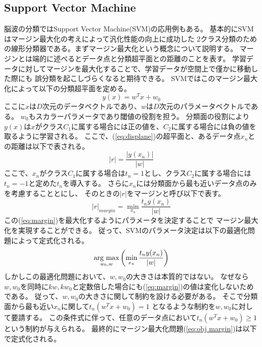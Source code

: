 \subsection{Support Vector Machine}
脳波の分類ではSupport Vector Machine(SVM)の応用例もある。
基本的にSVMはマージン最大化の考えによって汎化性能の向上に成功した
2クラス分類のための線形分類器である。まずマージン最大化という概念について説明する。
マージンとは端的に述べるとデータ点と分類超平面との距離のことを表す。
学習データに対してマージンを最大化することで、学習データが空間上で僅かに移動した際にも
誤分類を起こしづらくなると期待できる。
SVMではこのマージン最大化によって以下の分類超平面を定める。
\begin{equation}
    y(x) = w^Tx + w_0
    \label{eq:displane}
\end{equation}
ここに\(x\)は\(D\)次元のデータベクトルであり、\(w\)は\(D\)次元のパラメータベクトルである。
\(w_0\)もスカラーパラメータであり閾値の役割を担う。
分類面の役割により\(y(x)\)は\(x\)がクラス\(C_1\)に属する場合には正の値を、\(C_2\)に属する場合には負の値を取るように学習される。
ここで、(\ref{eq:displane})の超平面と、あるデータ点\(x_n\)との距離は以下で表される。
\begin{equation}
    |r| = \frac{|y(x_n)|}{|w|}
    \label{eq:distance}
\end{equation}
ここで、\(x_n\)がクラス\(C_1\)に属する場合は\(t_n=1\)とし、クラス\(C_2\)に属する場合には
\(t_n=-1\)と定めた\(t_n\)を導入する。
さらに\(x_n\)には分類面から最も近いデータ点のみを考慮することとにし、
そのときの\(|r|\)をマージンと呼び以下で表す。
\begin{equation}
    |r|_{margin} = \min_{x_n}\frac{t_ny(x_n)}{|w|}
    \label{eq:margin}
\end{equation}
この(\ref{eq:margin})を最大化するようにパラメータを決定することで
マージン最大化を実現することができる。
従って、SVMのパラメータ決定は以下の最適化問題によって定式化される。
\begin{equation}
    \mathop{\rm arg~max}\limits_{w_0,w}\left(\min_{x_n}\frac{t_ny(x_n)}{|w|}\right)
    \label{eq:obj margin}
\end{equation}
しかしこの最適化問題において、\(w,w_0\)の大きさは本質的ではない。
なぜなら\(w,w_0\)を同時に\(kw,kw_0\)と定数倍した場合にも(\ref{eq:margin})の値は変化しないためである。
従って、\(w,w_0\)の大きさに関して制約を設ける必要がある。
そこで分類面から最も近い\(x_n\)に関して\(t_n(w^Tx+w_0)=1\)
となるような制約を\(w,w_0\)に対して要請する。
この条件式に伴って、任意のデータ点において\(t_n(w^Tx+w_0) \geq 1 \)という制約が与えられる。
最終的にマージン最大化問題(\ref{eq:obj margin})は以下で定式化される。
